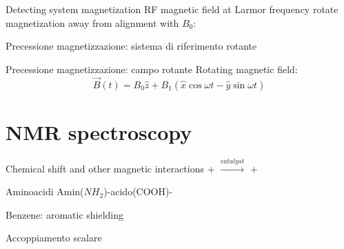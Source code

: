 \begin{frame}{Detecting system magnetization}
RF magnetic field at Larmor frequency rotate magnetization away from alignment with $B_0$:
\end{frame}

\begin{frame}{Precessione magnetizzazione: sistema di riferimento rotante}

\end{frame}

\begin{frame}{Precessione magnetizzazione: campo rotante}
   Rotating magnetic field:
   \begin{equation*}
   \vec{B}(t)=B_0\hat{z}+B_1(\hat{x}\cos{\omega t}-\hat{y}\sin{\omega t})
   \end{equation*}
\end{frame}

\section{NMR spectroscopy}

\begin{frame}{Chemical shift and other magnetic interactions}
 \hspace{.5mm} + \hspace{.5mm}  \hspace{.5cm} $\xrightarrow{catalyst}$ \hspace{.5mm}  \hspace{.5mm} + \hspace{.5mm} 
\end{frame}

\begin{frame}{Aminoacidi}
Amin($NH_2$)-acido(COOH)-
\end{frame}

\begin{frame}{Benzene: aromatic shielding}
    
\end{frame}

\begin{frame}{Accoppiamento scalare}
    
\end{frame}